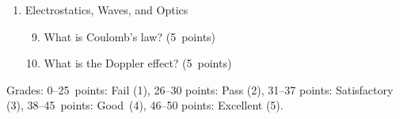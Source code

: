 \documentclass[a4paper,12pt]{letter}
\begin{document}
\begin{enumerate}[label=\Roman*.]
\begin{enumerate}[label=\arabic*.]
\item What is thermal expansion? What is linear expansion? What is volumetric expansion? \hfill (5~points)



\item What is the ideal gas model? What is the ideal gas equation conceptually? \hfill (5~points)


\item What is the Carnot cycle? \hfill (5~points)


\end{enumerate}
  

\item Electrostatics, Waves, and Optics

\begin{enumerate}[label=\arabic*.]
\setcounter{enumii}{8} %
  
\item What is Coulomb’s law? \hfill (5~points)

  
\item What is the Doppler effect? \hfill (5~points)


\end{enumerate}

\end{enumerate}


Grades: 0–25~points: Fail (1), 26–30 points: Pass (2), 31–37 points: Satisfactory (3), 38–45~points: Good~(4), 46–50 points: Excellent (5).


\vfill
\end{document}
